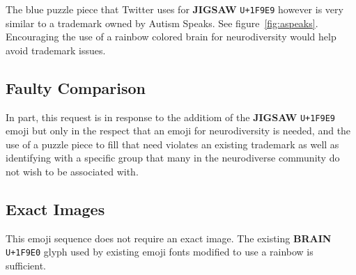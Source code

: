 The blue puzzle piece that Twitter uses for \textbf{JIGSAW} \texttt{U+1F9E9} however is very similar to a trademark owned by Autism Speaks. See figure~\ref{fig:aspeaks}. Encouraging the use of a rainbow colored brain for neurodiversity would help avoid trademark issues.

\subsection{Faulty Comparison}

In part, this request is in response to the additiom of the \textbf{JIGSAW} \texttt{U+1F9E9} emoji but only in the respect that an emoji for neurodiversity is needed, and the use of a puzzle piece to fill that need violates an existing trademark as well as identifying with a specific group that many in the neurodiverse community do not wish to be associated with.

\subsection{Exact Images}

This emoji sequence does not require an exact image. The existing \textbf{BRAIN} \texttt{U+1F9E0} glyph used by existing emoji fonts modified to use a rainbow is sufficient.
